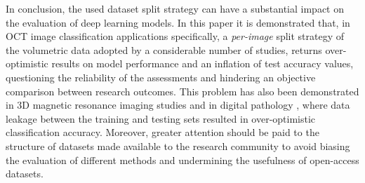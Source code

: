 \documentclass[fleqn,10pt]{wlscirep}
\begin{document}
In conclusion, the used dataset split strategy can have a substantial impact on the evaluation of deep learning models. In this paper it is demonstrated that, in OCT image classification applications specifically, a \textit{per-image} split strategy of the volumetric data adopted by a considerable number of studies, returns over-optimistic results on model performance and an inflation of test accuracy values, questioning the reliability of the assessments and hindering an objective comparison between research outcomes. This problem has also been demonstrated in 3D magnetic resonance imaging studies \cite{yagis2021effect} and in digital pathology \cite{bussola2021ai}, where data leakage between the training and testing sets resulted in over-optimistic classification accuracy. Moreover, greater attention should be paid to the structure of datasets made available to the research community to avoid biasing the evaluation of different methods and undermining the usefulness of open-access datasets. 
\end{document}
